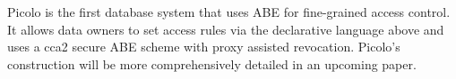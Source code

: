 \newline\newline
Picolo is the first database system that uses ABE for fine-grained access control. It allows data owners to set access rules via the declarative language above and uses a cca2 secure ABE scheme with proxy assisted revocation. Picolo's construction will be more comprehensively detailed in an upcoming paper.

